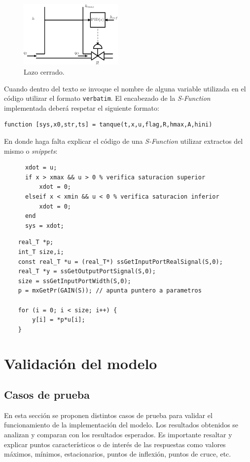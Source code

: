 \documentclass[10pt]{article}
\begin{document}
\begin{figure}[h]
\centering
\includegraphics[width=0.45\textwidth]{img/tanques_control}
\caption{Lazo cerrado.}
\label{fig:}
\end{figure}

Cuando dentro del texto se invoque el nombre de alguna variable utilizada en el código utilizar el formato \verb=verbatim=. El encabezado de la \textit{S-Function} implementada deberá respetar el siguiente formato:
\begin{verbatim}
function [sys,x0,str,ts] = tanque(t,x,u,flag,R,hmax,A,hini)
\end{verbatim}

En donde haga falta explicar el código de una \textit{S-Function} utilizar extractos del mismo o \textit{snippets}:

\lstset{style = custommatlab}

\begin{lstlisting}
      xdot = u;
      if x > xmax && u > 0 % verifica saturacion superior
          xdot = 0;
      elseif x < xmin && u < 0 % verifica saturacion inferior
          xdot = 0;
      end
      sys = xdot;
\end{lstlisting}

\lstset{style = customcpp}

\begin{lstlisting}
    real_T *p;
    int_T size,i;
    const real_T *u = (real_T*) ssGetInputPortRealSignal(S,0);
    real_T *y = ssGetOutputPortSignal(S,0);
    size = ssGetInputPortWidth(S,0); 
    p = mxGetPr(GAIN(S)); // apunta puntero a parametros

    for (i = 0; i < size; i++) {
        y[i] = *p*u[i];
    }
\end{lstlisting}

\section{Validación del modelo}
\subsection{Casos de prueba}
En esta sección se proponen distintos casos de prueba para validar el funcionamiento de la implementación del modelo. Los resultados obtenidos se analizan y comparan con los resultados esperados. Es importante resaltar y explicar puntos característicos o de interés de las respuestas como valores máximos, mínimos, estacionarios, puntos de inflexión, puntos de cruce, etc.
\end{document}
